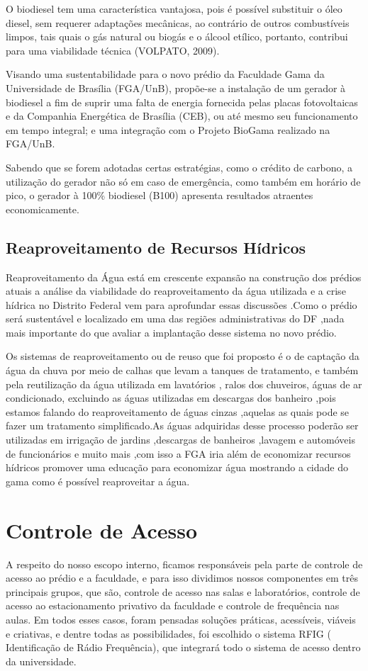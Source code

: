 O biodiesel tem uma característica vantajosa, pois é possível substituir o óleo diesel, sem requerer adaptações mecânicas, ao contrário de outros combustíveis limpos, tais quais o gás natural ou biogás e o álcool etílico, portanto, contribui para uma viabilidade técnica (VOLPATO, 2009).

Visando uma sustentabilidade para o novo prédio da Faculdade Gama da Universidade de Brasília (FGA/UnB), propõe-se a instalação de um gerador à biodiesel a fim de suprir uma falta de energia fornecida pelas placas fotovoltaicas e da Companhia Energética de Brasília (CEB), ou até mesmo seu funcionamento em tempo integral; e uma integração com o Projeto BioGama realizado na FGA/UnB.

Sabendo que se forem adotadas certas estratégias, como o crédito de carbono, a utilização do gerador não só em caso de emergência, como também em horário de pico, o gerador à 100\% biodiesel (B100) apresenta resultados atraentes economicamente.
\section{Reaproveitamento de Recursos Hídricos}

Reaproveitamento da Água está em crescente expansão na construção dos prédios atuais a análise da viabilidade do reaproveitamento da água utilizada e a crise hídrica no Distrito Federal vem para aprofundar essas discussões .Como o prédio será sustentável e localizado em uma das regiões administrativas do DF ,nada mais importante do que avaliar a implantação desse sistema no novo prédio.

Os sistemas de reaproveitamento ou de reuso que foi proposto é o de captação da água da chuva por meio de calhas que levam a tanques de tratamento, e também pela reutilização da água utilizada em lavatórios , ralos dos chuveiros, águas de ar condicionado, excluindo as águas utilizadas em descargas dos banheiro ,pois estamos falando do reaproveitamento de águas cinzas ,aquelas as quais pode se fazer um tratamento simplificado.As águas adquiridas desse processo poderão ser utilizadas em irrigação de jardins ,descargas de banheiros ,lavagem e automóveis de funcionários e muito mais ,com isso a FGA iria além de economizar recursos hídricos promover uma educação para economizar água mostrando a cidade do gama como é possível reaproveitar a água.

\chapter[Controle de Acesso]{Controle de Acesso}
A respeito do nosso escopo interno, ficamos responsáveis pela parte de controle de acesso ao prédio e a faculdade, e para isso dividimos nossos componentes em três principais grupos, que são, controle de acesso nas salas e laboratórios, controle de acesso ao estacionamento privativo da faculdade e controle de frequência nas aulas. Em todos esses casos, foram pensadas soluções práticas, acessíveis, viáveis e criativas, e dentre todas as possibilidades, foi escolhido o sistema RFIG ( Identificação de Rádio Frequência), que integrará todo o sistema de acesso dentro da universidade.

